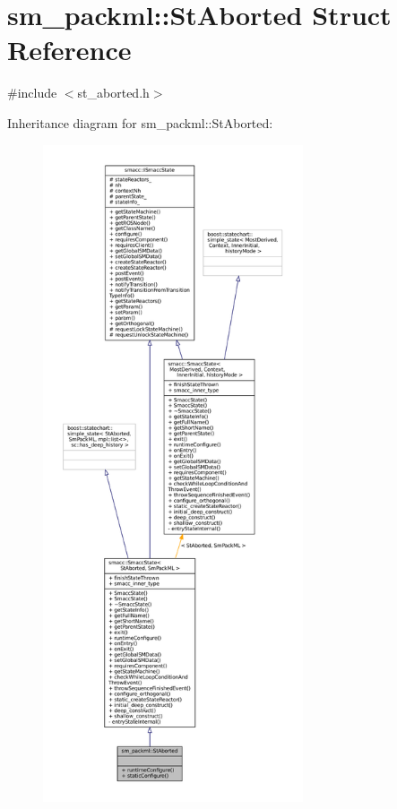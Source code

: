 \hypertarget{structsm__packml_1_1StAborted}{}\section{sm\+\_\+packml\+:\+:St\+Aborted Struct Reference}
\label{structsm__packml_1_1StAborted}


{\ttfamily \#include $<$st\+\_\+aborted.\+h$>$}



Inheritance diagram for sm\+\_\+packml\+:\+:St\+Aborted\+:
\nopagebreak
\begin{figure}[H]
\begin{center}
\leavevmode
\includegraphics[height=550pt]{structsm__packml_1_1StAborted__inherit__graph}
\end{center}
\end{figure}


